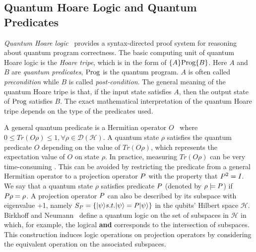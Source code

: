 %
\subsection{Quantum Hoare Logic and Quantum Predicates}
\textit{Quantum Hoare logic}~\cite{Ying2012FloydhoareLF} provides a syntax-directed proof system for reasoning about quantum program correctness. The basic computing unit of quantum Hoare logic is the \textit{Hoare tripe}, which is in the form of $\{A\}\text{Prog}\{B\}$. Here $A$ and $B$ are \textit{quantum predicates}, $\text{Prog}$ is the quantum program. $A$ is often called \textit{precondition} while $B$ is called \textit{post-condition}. The general meaning of the quantum Hoare tripe is that, if the input state satisfies $A$, then the output state of $\text{Prog}$ satisfies $B$. The exact mathematical interpretation of the quantum Hoare tripe depends on the type of the predicates used.

 
A general quantum predicate is a Hermitian operator $O$~\cite{Ying2012FloydhoareLF} where $0 \le Tr(O\rho) \le 1, \forall \rho \in \mathcal{D(H)}$. %
A quantum state $\rho$ satisfies the quantum predicate $O$ depending on the value of $Tr(O\rho)$, which represents the expectation value of $O$ on state $\rho$. 
In practice, measuring $Tr(O\rho)$ can be very time-consuming . 
This can be avoided by restricting the predicate from a general Hermitian operator to a projection operator $P$ with the property that $P^2 = I$.
We say that a quantum state $\rho$ satisfies predicate $P$ (denoted by $\rho \models P$) if $P\rho = \rho$. %
A projection operator $P$ can also be described by its subspace with eigenvalue +1, namely $S_{P}= \{ \vert \psi \rangle s.t. \vert \psi \rangle = P\vert \psi \rangle \}$ in the qubits' Hilbert space $\mathcal{H}$. Birkhoff and Neumann~\cite{Birkhoff1936TheLO} define a quantum logic on the set of subspaces in $\mathcal{H}$ in which, for example, the logical {\bf and} corresponds to the intersection of subspaces. This construction induces logic operations %
on projection operators by considering the equivalent operation on the associated subspaces.





